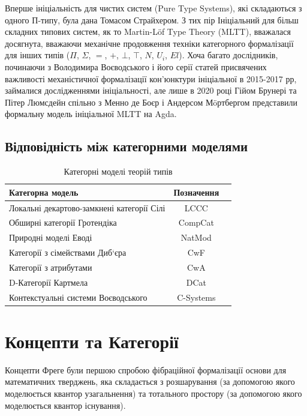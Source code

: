 Вперше ініціальність для чистих систем (Pure Type Systems), які складаються з одного П-типу,
була дана Томасом Страйхером. З тих пір Ініціальний для більш складних
типових систем, як то Martin-Löf Type Theory (MLTT), вважалася досягнута, вважаючи
механічне продовження техніки категорного формалізації для інших типів ($\Pi$, $\Sigma$, $=$, $+$, $\bot$, $\top$, $N$, $U_i$, $El$).
Хоча багато дослідників, починаючи з Володимира Воєводського і його серії статей
присвячених важливості механістичної формалізації кон'юнктури ініціальної в 2015-2017 рр,
займалися дослідженнями ініціальності, але лише в 2020 році Гійом Брунері та Пітер Люмсдейн
спільно з Менно де Боєр і Андерсом Мöртбергом представили формальну модель ініціальної
MLTT на Agda.

\subsection{Відповідність між категорними моделями}

\begin{table}[ht]
 \caption{Категорні моделі теорій типів}
  \begin{tabular}{lcc}
    \hline
\rowcolor{ZimaBlue}
       \textbf{Категорна модель} & \textbf{Позначення} \\
    \hline
 Локальні декартово-замкнені категорії Сілі & LCCC \\
 Обширні категорії Гротендіка               & CompCat \\
 Природні моделі Еводі                      & NatMod \\
 Категорії з сімействами Диб`єра            & CwF \\
 Категорії з атрибутами                     & CwA \\
 D-Категорії Картмела                       & DCat \\
 Контекстуальні системи Воєводського        & C-Systems \\
    \hline
  \end{tabular}
\end{table}

\newpage
\section{Концепти та Категорії}
Концепти Фреге були першою спробою фібраційної формалізації основи для математичних тверджень,
яка складається з розшарування (за допомогою якого моделюється квантор узагальнення) та
тотального простору (за допомогою якого моделюється квантор існування).

